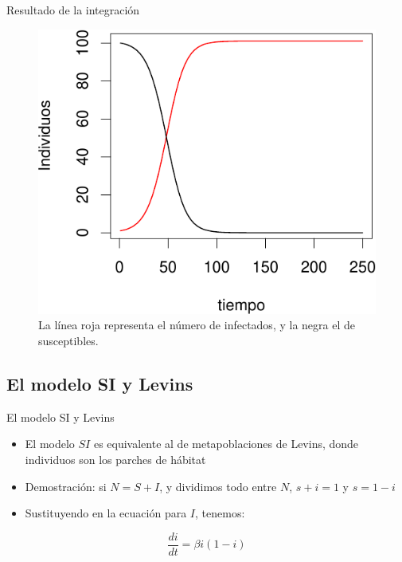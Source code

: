 \documentclass[
  11pt,
  ignorenonframetext,
]{beamer}
\begin{document}
\begin{frame}{Resultado de la integración}
\begin{figure}

{\centering \includegraphics{Modelos-SI-SIR_files/figure-beamer/unnamed-chunk-2-1} 

}

\caption{La línea roja representa el número de infectados, y la negra el de susceptibles.}\label{fig:unnamed-chunk-2}
\end{figure}
\end{frame}

\hypertarget{el-modelo-si-y-levins}{%
\subsection{El modelo SI y Levins}\label{el-modelo-si-y-levins}}

\begin{frame}{El modelo SI y Levins}
\begin{itemize}
\item
  El modelo \(SI\) es equivalente al de metapoblaciones de Levins, donde
  individuos son los parches de hábitat
\item
  Demostración: si \(N = S + I\), y dividimos todo entre \(N\),
  \(s + i = 1\) y \(s = 1-i\)
\item
  Sustituyendo en la ecuación para \(I\), tenemos:
\end{itemize}

\[\frac{di}{dt} = \beta i (1-i)\]
\end{frame}
\end{document}
